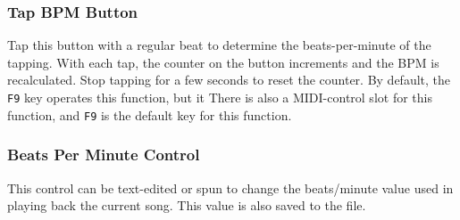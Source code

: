 
\subsubsection{Tap BPM Button}
\label{subsubsec:introduction_tap_bpm_button}

   Tap this button with a regular beat to determine the beats-per-minute of the
   tapping.  With each tap, the counter on the button increments and the BPM is
   recalculated.  Stop tapping for a few seconds to reset the counter.
   By default, the \texttt{F9} key operates this function, but it
   There is also a MIDI-control slot for this function, and
   \texttt{F9} is the default key for this function.

\subsubsection{Beats Per Minute Control}
\label{subsubsec:introduction_bpm_control}

   This control can be text-edited or spun to change the beats/minute value
   used in playing back the current song.  This value is also saved to the
   file.

